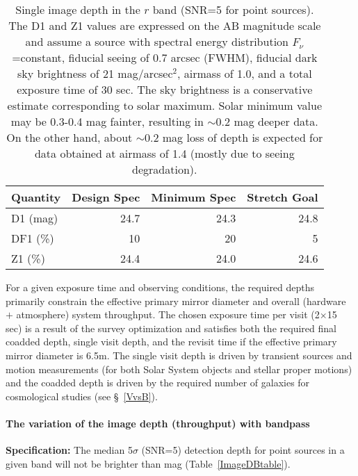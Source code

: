 \begin{table}[h]
\label{tsi}
\begin{tabular}{|l|r|r|r|}
\hline
Quantity        & Design Spec & Minimum Spec & Stretch Goal   \\
\hline
      D1 (mag)  &    24.7     &     24.3    &     24.8        \\
      DF1 (\%)  &    10       &      20     &       5         \\
      Z1  (\%)  &    24.4     &     24.0    &     24.6        \\
\hline
\end{tabular}
\caption{Single image depth in the $r$ band (SNR=5 for point sources).
The D1 and Z1 values are expressed on the AB magnitude scale
and assume a source with spectral energy distribution $F_\nu$=constant,
fiducial seeing of 0.7 arcsec (FWHM), fiducial dark sky brightness of
21 mag/arcsec$^2$, airmass of 1.0, and a total exposure time of 30 sec.
The sky brightness is a conservative estimate corresponding
to solar maximum. Solar minimum value may be 0.3-0.4 mag fainter, resulting
in $\sim$0.2 mag deeper data. On the other hand, about  $\sim$0.2 mag loss
of depth is expected for data obtained at airmass of 1.4 (mostly due to
seeing degradation). }
\label{ImageDtable}
\end{table}

For a given exposure time and observing conditions, the required depths
primarily constrain the effective primary mirror diameter and overall
(hardware $+$ atmosphere) system throughput. The chosen exposure time per visit
(2$\times$15 sec) is a result of the survey optimization and satisfies
both the required final coadded depth, single visit depth, and the revisit
time if the effective primary mirror diameter is 6.5m.
The single visit depth is driven by transient sources and motion measurements
(for both Solar System objects and stellar proper motions) and the coadded
depth is driven by the required number of galaxies for cosmological studies
(see \S~\ref{VvsB}).



\paragraph{The variation of the image depth (throughput) with bandpass\\}

\textbf{Specification:} The median 5$\sigma$ (SNR=5) detection
depth for point sources in a given band will not be brighter than
mag (Table~\ref{ImageDBtable}).


